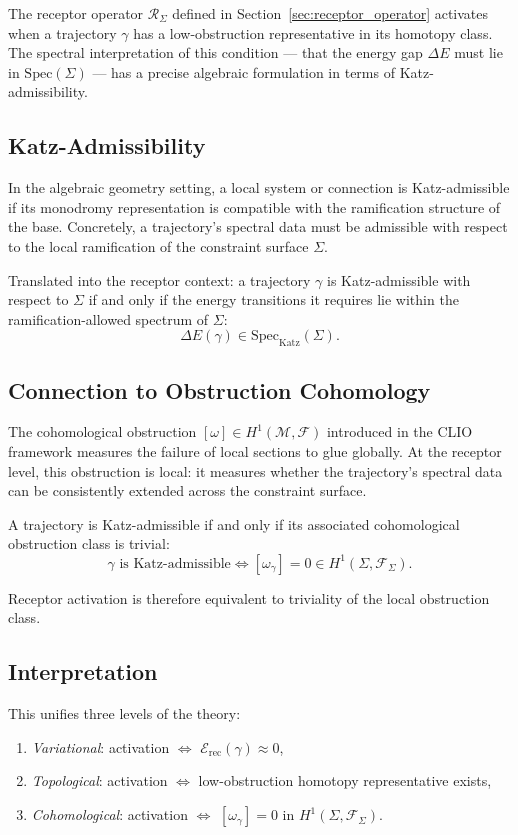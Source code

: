 \documentclass[12pt,a4paper]{article}
\begin{document}
The receptor operator $\mathcal{R}_\Sigma$ defined in Section~\ref{sec:receptor_operator} activates when a trajectory $\gamma$ has a low-obstruction representative in its homotopy class. The spectral interpretation of this condition --- that the energy gap $\Delta E$ must lie in $\mathrm{Spec}(\Sigma)$ --- has a precise algebraic formulation in terms of Katz-admissibility.

\subsection{Katz-Admissibility}

In the algebraic geometry setting, a local system or connection is Katz-admissible if its monodromy representation is compatible with the ramification structure of the base. Concretely, a trajectory's spectral data must be admissible with respect to the local ramification of the constraint surface $\Sigma$.

Translated into the receptor context: a trajectory $\gamma$ is Katz-admissible with respect to $\Sigma$ if and only if the energy transitions it requires lie within the ramification-allowed spectrum of $\Sigma$:
\[
\Delta E(\gamma) \in \mathrm{Spec}_{\mathrm{Katz}}(\Sigma).
\]

\subsection{Connection to Obstruction Cohomology}

The cohomological obstruction $[\omega] \in H^1(\mathcal{M}, \mathcal{F})$ introduced in the CLIO framework measures the failure of local sections to glue globally. At the receptor level, this obstruction is local: it measures whether the trajectory's spectral data can be consistently extended across the constraint surface.

A trajectory is Katz-admissible if and only if its associated cohomological obstruction class is trivial:
\[
\gamma \text{ is Katz-admissible} \iff [\omega_\gamma] = 0 \in H^1(\Sigma, \mathcal{F}_\Sigma).
\]

Receptor activation is therefore equivalent to triviality of the local obstruction class.

\subsection{Interpretation}

This unifies three levels of the theory:
\begin{enumerate}[noitemsep]
\item \emph{Variational}: activation $\iff$ $\mathcal{E}_{\text{rec}}(\gamma) \approx 0$,
\item \emph{Topological}: activation $\iff$ low-obstruction homotopy representative exists,
\item \emph{Cohomological}: activation $\iff$ $[\omega_\gamma] = 0$ in $H^1(\Sigma, \mathcal{F}_\Sigma)$.
\end{enumerate}
\end{document}
